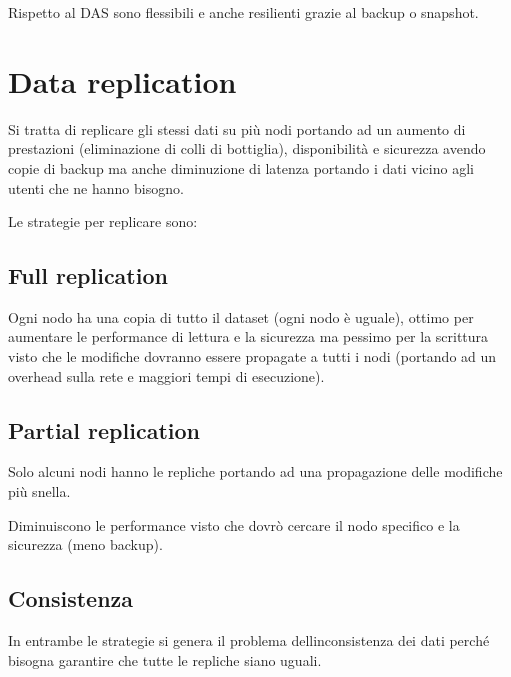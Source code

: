 \documentclass[
]{article}
\begin{document}
{Rispetto al DAS sono flessibili e anche resilienti grazie al backup o
snapshot.}

{}

\section{\texorpdfstring{{Data
replication}}{Data replication}}\label{h.dkogd4o06dn3}

{Si tratta di replicare gli stessi dati su più nodi portando ad un
aumento di prestazioni (eliminazione di colli di bottiglia),
disponibilità e sicurezza avendo copie di backup ma anche diminuzione di
latenza portando i dati vicino agli utenti che ne hanno bisogno.}

{}

{Le strategie per replicare sono:}

{}

\subsection{\texorpdfstring{{Full
replication}}{Full replication}}\label{h.gun856a6oe8d}

{Ogni nodo ha una copia di tutto il dataset (ogni nodo è uguale), ottimo
per aumentare le performance di lettura e la sicurezza ma pessimo per la
scrittura visto che le modifiche dovranno essere propagate a tutti i
nodi (portando ad un overhead sulla rete e maggiori tempi di
esecuzione).}

{}

\subsection{\texorpdfstring{{Partial
replication}}{Partial replication}}\label{h.b0o98mp8l9oe}

{Solo alcuni nodi hanno le repliche portando ad una propagazione delle
modifiche più snella.}

{Diminuiscono le performance visto che dovrò cercare il nodo specifico e
la sicurezza (meno backup).}

{}

\subsection{\texorpdfstring{{Consistenza}}{Consistenza}}\label{h.8ejqij3ki14k}

{In entrambe le strategie si genera il problema
dell\textquotesingle inconsistenza dei dati perché bisogna garantire che
tutte le repliche siano uguali.}
\end{document}
